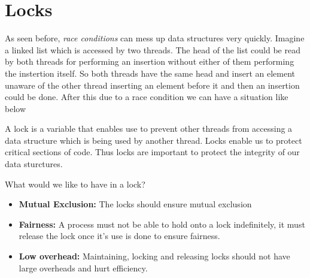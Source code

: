 \documentclass[12pt]{article}
\newcommand{\tbox}[1]{\noindent\fbox{\parbox{\textwidth}{#1}}}
\begin{document}
\noindent\tbox{
    \begin{center}
    \textbf{\Huge Lecture 22}
    \end{center}
}
\section{Locks}
As seen before, \textit{race conditions} can mess up data structures very quickly. Imagine a linked list which is accessed by two threads. 
The head of the list could be read by both threads for performing an insertion without either of them performing the instertion itself. So both threads have the same head and insert an element unaware of the other thread inserting an element before it and then an insertion could be done. After this due to a race condition we can 
have a situation like below

\begin{center}
\end{center}

A lock is a variable that enables use to prevent other threads from accessing a data structure which is being used by another thread.
Locks enable us to protect critical sections of code. Thus locks are important to protect the integrity of our data sturctures. 

What would we like to have in a lock?
\begin{itemize}[topsep=0pt, partopsep=0pt, itemsep=0pt, parsep=0pt]
    \item \textbf{Mutual Exclusion:} The locks should ensure mutual exclusion
    \item \textbf{Fairness:} A process must not be able to hold onto a lock indefinitely, it must release the lock once it's use is done to ensure fairness. 
    \item \textbf{Low overhead:} Maintaining, locking and releasing locks should not have large overheads and hurt efficiency.  
\end{itemize} 
\end{document}
